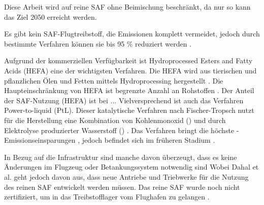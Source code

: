 Diese Arbeit wird auf reine SAF ohne Beimischung beschränkt, da nur so kann das Ziel 2050 erreicht werden.

Es gibt kein SAF-Flugtreibstoff, die Emissionen komplett vermeidet, jedoch durch bestimmte Verfahren können sie
bis 95 \% reduziert werden \cite{icao_saf_conversion_2024}.


 
Aufgrund der kommerziellen Verfügbarkeit ist Hydroprocessed Esters and Fatty Acids (HEFA) eine der wichtigsten Verfahren.
Die HEFA wird aus tierischen und pflanzlichen Ölen und Fetten mittels Hydroprocessing hergestellt \cite{bauen2020sustainable}. 
Die Haupteinschränkung von HEFA ist begrenzte Anzahl an Rohstoffen \cite{bauen2020sustainable}.
Der Anteil der SAF-Nutzung (HEFA) ist bei ...
Vielversprechend ist auch das Verfahren Power-to-liquid (PtL).
Dieser katalytische Verfahren nach Fischer-Tropsch nutzt für die Herstellung eine Kombination von Kohlenmonoxid () und durch Elektrolyse produzierter Wasserstoff () \cite{bauen2020sustainable}.
Das Verfahren bringt die höchste -Emissionseinsparungen \cite{de2017life}, jedoch befindet sich im früheren Stadium \cite{bauen2020sustainable}.

In Bezug auf die Infrastruktur sind manche davon überzeugt, dass es keine Änderungen im Flugzeug oder Betankungssystem notwendig sind \cite{sky2020hydrogen} %
Wobei Dahal et al. \cite{dahal2021techno} geht jedoch davon aus, dass neue Antriebe und Triebwerke für die Nutzung des reinen SAF entwickelt werden müssen.
Das reine SAF wurde noch nicht zertifiziert, um in das Treibstofflager vom Flughafen zu gelangen \cite{iata_saf_2024}.


